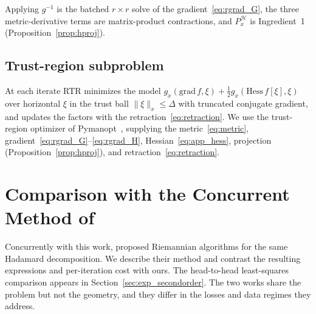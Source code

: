 \documentclass[letterpaper, 10 pt, conference]{ieeeconf}
\newcommand{\cH}{\mathcal{H}}
\theoremstyle{plain}
\theoremstyle{definition}
\theoremstyle{remark}
\begin{document}
Applying $g^{-1}$ is the batched $r\times r$ solve of the gradient~\eqref{eq:rgrad_G}, the three metric-derivative terms are matrix-product contractions, and $P_x^{\cH}$ is Ingredient~1 (Proposition~\ref{prop:hproj}). 


\subsection{Trust-region subproblem}
At each iterate RTR minimizes the model $g_x(\mathrm{grad}\,f,\xi) + \tfrac12 g_x(\mathrm{Hess}\,f[\xi],\xi)$ over horizontal $\xi$ in the trust ball $\|\xi\|_x\le\Delta$ with truncated conjugate gradient, and updates the factors with the retraction~\eqref{eq:retraction}. We use the trust-region optimizer of Pymanopt~\cite{pymanopt}, supplying the metric~\eqref{eq:metric}, gradient~\eqref{eq:rgrad_G}--\eqref{eq:rgrad_H}, Hessian~\eqref{eq:app_hess}, projection (Proposition~\ref{prop:hproj}), and retraction~\eqref{eq:retraction}.



\section{Comparison with the Concurrent Method of \citet{gillis2026manifold}}
\label{app:gillis}
Concurrently with this work, \citet{gillis2026manifold} proposed Riemannian algorithms for the same Hadamard decomposition. We describe their method and contrast the resulting expressions and per-iteration cost with ours. The head-to-head least-squares comparison appears in Section~\ref{sec:exp_secondorder}. The two works share the problem but not the geometry, and they differ in the losses and data regimes they address.
\end{document}
